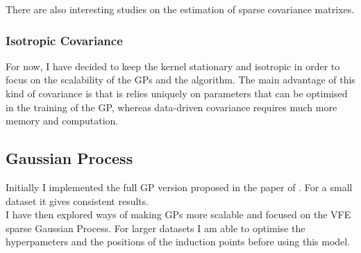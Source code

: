 There are also interesting studies on the estimation of sparse covariance matrixes. \\



%
%



\subsubsection{Isotropic Covariance}

For now, I have decided to keep the kernel stationary and isotropic  in order to focus on the scalability of the GPs and the algorithm. The main advantage of this kind of covariance is that is relies uniquely on parameters that can be optimised in the training of the GP, whereas data-driven covariance requires much more memory and computation. 

\subsection{Gaussian Process}

Initially I implemented the full GP version proposed in the paper of \cite{krause_near-optimal_2008}. For a small dataset it gives consistent results. \\

I have then explored ways of making GPs more scalable and focused on the VFE sparse Gaussian Process. For larger datasets I am able to optimise the hyperpameters and the positions of the induction points before using this model.  \\


